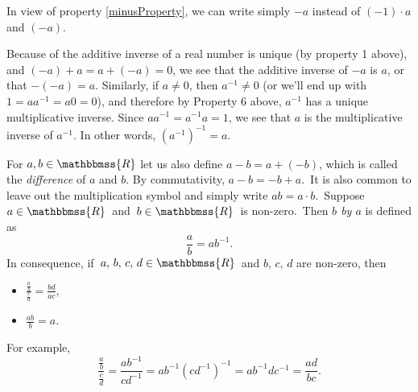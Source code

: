 \documentclass[12pt]{article}
\newcommand{\R}{\mathbbmss{R}}
\begin{document}
In view of property \ref{minusProperty}, we can write simply $-a$ 
instead of $(-1)\cdot a$ and $(-a)$.  

Because of the additive inverse of a real number is unique (by property 1 above), and $(-a)+a=a+(-a)=0$, we see that the additive inverse of $-a$ is $a$, or that $-(-a)=a$.  Similarly, if $a\ne 0$, then $a^{-1}\ne 0$ (or we'll end up with $1=aa^{-1}=a0=0$), and therefore by Property 6 above, $a^{-1}$ has a unique multiplicative inverse.  Since $aa^{-1}=a^{-1}a=1$, we see that $a$ is the multiplicative inverse of $a^{-1}$.  In other words, $(a^{-1})^{-1}=a$.

For $a,b\in \R$ let us also define $a-b=a+(-b)$, which is called 
the \emph{difference} of $a$ and $b$.
By commutativity, $a-b=-b+a$.\, It is also common to leave out the
multiplication symbol and simply write $ab=a\cdot b$.\, Suppose\, 
$a\in \R$\, and\, $b\in \R$\, is non-zero.\, Then \emph{$b$
 by $a$} is defined as 
$$ 
   \frac{a}{b} = ab^{-1}.
$$
In consequence, if\, $a,\,b,\,c,\,d\in \R$\, and $b,\,c,\,d$ are non-zero, then 
\begin{itemize}
\item $ \frac{\frac{a}{b}}{\frac{c}{d}} = \frac{bd}{ac}$,
\item $\frac{ab}{b}=a$.
\end{itemize}
For example, 
$$
 \frac{\frac{a}{b}}{\frac{c}{d}} = \frac{ab^{-1}}{cd^{-1}}=
ab^{-1}(cd^{-1})^{-1}
= ab^{-1} d c^{-1}=
\frac{ad}{bc}.
$$
\end{document}
